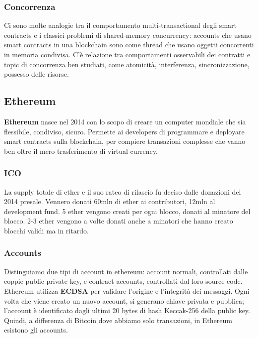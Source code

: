 \documentclass[11pt]{article}
\begin{document}
\subsubsection{Concorrenza}
Ci sono molte analogie tra il comportamento multi-transactional degli smart contracts e i classici problemi di shared-memory concurrency: accounts che usano smart contracts in una blockchain sono come thread che usano oggetti concorrenti in memoria condivisa. C'è relazione tra comportamenti osservabili dei contratti e topic di concorrenza ben studiati, come atomicità, interferenza, sincronizzazione, possesso delle risorse.

\subsection{Ethereum}
\textbf{Ethereum} nasce nel 2014 con lo scopo di creare un computer mondiale che sia flessibile, condiviso, sicuro. Permette ai developers di programmare e deployare smart contracts sulla blockchain, per compiere transazioni complesse che vanno ben oltre il mero trasferimento di virtual currency. 
\subsubsection{ICO} La supply totale di ether e il suo rateo di rilascio fu deciso dalle donazioni del 2014 presale. Vennero donati 60mln di ether ai contributori, 12mln al development fund. 5 ether vengono creati per ogni blocco, donati al minatore del blocco. 2-3 ether vengono a volte donati anche a minatori che hanno creato blocchi validi ma in ritardo. 
\subsubsection{Accounts} 
Distinguiamo due tipi di account in ethereum: account normali, controllati dalle coppie public-private key, e contract accounts, controllati dal loro source code. Ethereum utilizza \textbf{ECDSA} per validare l'origine e l'integrità dei messaggi. Ogni volta che viene creato un nuovo account, si generano chiave privata e pubblica; l'account è identificato dagli ultimi 20 bytes di hash Keccak-256 della public key. Quindi, a differenza di Bitcoin dove abbiamo solo transazioni, in Ethereum esistono gli accounts. 
\end{document}
